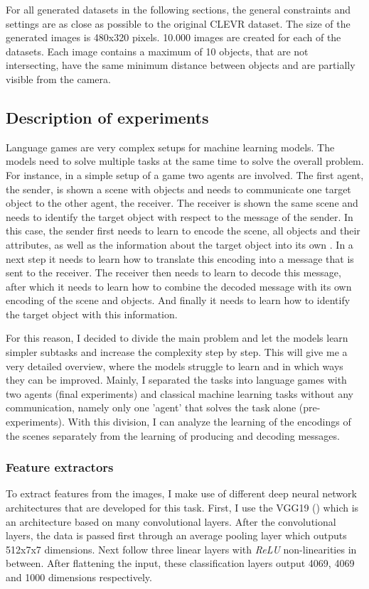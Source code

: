 For all generated datasets in the following sections, the general constraints and settings are as close as possible to the original CLEVR dataset.
The size of the generated images is 480x320 pixels.
10.000 images are created for each of the datasets.
Each image contains a maximum of 10 objects, that are not intersecting, have the same minimum distance between objects and are partially visible from the camera.

\subsection{Description of experiments}
Language games are very complex setups for machine learning models.
The models need to solve multiple tasks at the same time to solve the overall problem.
For instance, in a simple setup of a game two agents are involved.
The first agent, the sender, is shown a scene with objects and needs to communicate one target object to the other agent, the receiver.
The receiver is shown the same scene and needs to identify the target object with respect to the message of the sender.
In this case, the sender first needs to learn to encode the scene, all objects and their attributes, as well as the information about the target object into its own .
In a next step it needs to learn how to translate this encoding into a message that is sent to the receiver.
The receiver then needs to learn to decode this message, after which it needs to learn how to combine the decoded message with its own encoding of the scene and objects.
And finally it needs to learn how to identify the target object with this information.

For this reason, I decided to divide the main problem and let the models learn simpler subtasks and increase the complexity step by step.
This will give me a very detailed overview, where the models struggle to learn and in which ways they can be improved.
Mainly, I separated the tasks into language games with two agents (final experiments) and classical machine learning tasks without any communication, namely only one 'agent' that solves the task alone (pre-experiments).
With this division, I can analyze the learning of the encodings of the scenes separately from the learning of producing and decoding messages.

\subsubsection{Feature extractors}
To extract features from the images, I make use of different deep neural network architectures that are developed for this task.
First, I use the  VGG19 (\cite{Simonyan2015}) which is an architecture based on many convolutional layers.
After the convolutional layers, the data is passed first through an average pooling layer which outputs 512x7x7 dimensions.
Next follow three linear layers with \emph{ReLU} non-linearities in between.
After flattening the input, these classification layers output 4069, 4069 and 1000 dimensions respectively.

